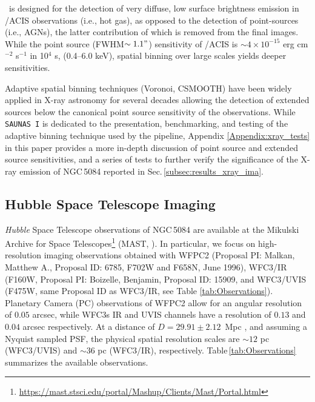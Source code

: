 \documentclass[modern]{CORE-AAS/aastex631}
\begin{document}
{\SAUNAS\ is designed for the detection of very diffuse, low surface brightness emission in \Chandra/ACIS observations (i.e., hot gas), as opposed to the detection of point-sources (i.e., AGNs), the latter contribution of which is removed from the final images. While the point source (FWHM$\sim1.1"$) sensitivity of \Chandra/ACIS is $\sim4\times10^{-15}$ erg cm$^{-2}$ s$^{-1}$ in 10$^4$ s, (0.4--6.0 keV), spatial binning over large scales yields deeper sensitivities.

Adaptive spatial binning techniques (Voronoi, CSMOOTH) \citep{cappellari+2003mnras342_345, ebeling+2006mnras368_65} have been widely applied in X-ray astronomy for several decades \citep[see][and references therein]{ebeling+2007apj661_33,gonzalezmartin+2009aap506_1107,broos+2010apj714_1582, ebeling+2010mnras407_83, xue+2011apj195_10, hodgeskluck+2012apj746_167, wang+2024apj962_188} allowing the detection of extended sources below the canonical point source sensitivity of the observations. While \texttt{SAUNAS I} \citep{borlaff+2024apj967_169} is dedicated to the presentation, benchmarking, and testing of the adaptive binning technique used by the pipeline, Appendix \ref{Appendix:xray_tests} in this paper provides a more in-depth discussion of point source and extended source sensitivities, and a series of tests to further verify the significance of the X-ray emission of NGC\,5084 reported in Sec.\,\ref{subsec:results_xray_ima}.

\subsection{Hubble Space Telescope Imaging} \label{sec:data_hst}

\emph{Hubble} Space Telescope observations of NGC\,5084 are available at the Mikulski Archive for Space Telescopes\footnote{\url{https://mast.stsci.edu/portal/Mashup/Clients/Mast/Portal.html}} (MAST, ). In particular, we focus on high-resolution imaging observations obtained with WFPC2 (Proposal PI: Malkan, Matthew A.,
Proposal ID: 6785, F702W and F658N, June 1996), WFC3/IR (F160W, Proposal PI: Boizelle, Benjamin, Proposal ID: 15909, and WFC3/UVIS (F475W, same Proposal ID as WFC3/IR, see Table \ref{tab:Observations}). Planetary Camera (PC) observations of WFPC2 allow for an angular resolution of $0.05$ arcsec, while WFC3s IR and UVIS channels have a resolution of $0.13$ and $0.04$ arcsec respectively. At a distance of $D=	29.91\pm2.12$~Mpc \citep[6.90~arcsec~kpc$^{-1}$,][]{koribalski+2004aj128_16}, and assuming a Nyquist sampled PSF, the physical spatial resolution scales are $\sim12$ pc (WFC3/UVIS) and $\sim36$ pc (WFC3/IR), respectively. Table\,\ref{tab:Observations} summarizes the available observations.



}
\end{document}
